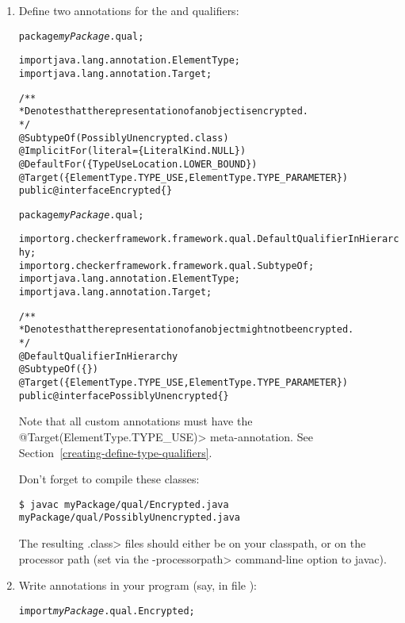 \begin{enumerate}
\item
Define two annotations for the  and  qualifiers:

\begin{alltt}
package \textit{myPackage}.qual;

import java.lang.annotation.ElementType;
import java.lang.annotation.Target;

/**
 * Denotes that the representation of an object is encrypted.
 */
@SubtypeOf(PossiblyUnencrypted.class)
@ImplicitFor(literal=\{LiteralKind.NULL\})
@DefaultFor(\{TypeUseLocation.LOWER_BOUND\})
@Target(\{ElementType.TYPE_USE, ElementType.TYPE_PARAMETER\})
public @interface Encrypted \{\}
\end{alltt}

\begin{alltt}
package \textit{myPackage}.qual;

import org.checkerframework.framework.qual.DefaultQualifierInHierarchy;
import org.checkerframework.framework.qual.SubtypeOf;
import java.lang.annotation.ElementType;
import java.lang.annotation.Target;

/**
 * Denotes that the representation of an object might not be encrypted.
 */
@DefaultQualifierInHierarchy
@SubtypeOf(\{\})
@Target(\{ElementType.TYPE_USE, ElementType.TYPE_PARAMETER\})
public @interface PossiblyUnencrypted \{\}
\end{alltt}

Note that all custom annotations must have the
\<@Target(ElementType.TYPE\_USE)> meta-annotation.
See Section~\ref{creating-define-type-qualifiers}.

Don't forget to compile these classes:

\begin{Verbatim}
$ javac myPackage/qual/Encrypted.java myPackage/qual/PossiblyUnencrypted.java
\end{Verbatim}

The resulting \<.class> files should either be on your classpath, or on the
processor path (set via the \<-processorpath> command-line option to javac).

\item
  Write  annotations in your program (say, in file
  ):

\begin{alltt}
import \textit{myPackage}.qual.Encrypted;


\end{alltt}
\end{enumerate}
